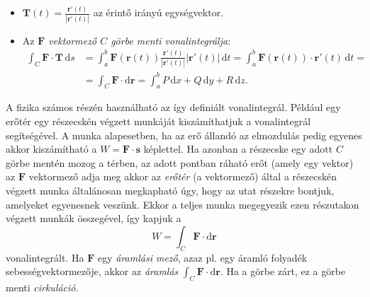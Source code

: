\documentclass[DIV=15,appendixprefix]{scrreprt}
\theoremstyle{definition}
\theoremstyle{remark}
\begin{document}
\begin{description}
\begin{itemize}
\begin{equation*}
					\mathbf{ x } \right)
					= P \left( x,{} y,{} z \right) \mathbf{ i } + Q \left( x,{} y,{} z \right)
					\mathbf{ j } + R \left( x,{} y,{} z \right) \mathbf{ k }.
				\end{equation*}
			\item $ \mathbf{ T } \left( t \right) = \frac{ \mathbf{ r }' \left( t \right) }{ \left|
				\mathbf{ r }' \left( t \right) \right| }$ az érintő irányú egységvektor.
			\item Az \emph{$ \mathbf{ F } $ vektormező $ C $ görbe menti vonalintegrálja}:
				\begin{align*}
					\int_{ C } \mathbf{ F } \cdot \mathbf{ T } \, \mathrm{ d } s &= \int_{ a }^{ b }
					\mathbf{ F } \left(
					\mathbf{ r } \left( t \right) \right) \frac{ \mathbf{ r }' \left( t
					\right) }{ \left| \mathbf{ r }' \left( t \right) \right| } \left| \mathbf{ r }'
					\left( t \right) \right| \, \mathrm{ d } t = \int_{ a }^{ b } \mathbf{ F }
					\left(
					\mathbf{ r } \left( t \right) \right) \cdot  \mathbf{ r }' \left( t \right) \,
					\mathrm{ d } t =\\
					&=\int_{ C } \mathbf{ F } \cdot \mathrm{ d } \mathbf{ r } = \int_{ a }^{ b } P
					\, \mathrm{ d } x + Q \, \mathrm{ d } y + R \, \mathrm{ d } z.
				\end{align*}
		\end{itemize}
\end{description}
A fizika számos részén használható az így definiált vonalintegrál. Például egy erőtér egy részecskén
végzett munkáját kiszámíthatjuk a vonalintegrál segítségével. A munka alapesetben, ha az erő állandó
az elmozdulás pedig egyenes akkor kiszámítható a $ W = \mathbf{ F } \cdot \mathbf{ s } $ képlettel.
Ha azonban a részecske egy adott $ C $ görbe mentén mozog a térben, az adott pontban ráható erőt
(amely egy vektor) az $ \mathbf{ F } $ vektormező adja meg akkor az \emph{erőtér} (a vektormező)
által a részecskén
végzett munka általánosan megkapható úgy, hogy az utat  részekre bontjuk,
amelyeket egyenesnek veszünk. Ekkor a teljes munka megegyezik ezen részutakon végzett munkák
összegével, így kapjuk a
\begin{equation*}
	W = \int_{ C } \mathbf{ F } \cdot \mathrm{ d } \mathbf{ r }
\end{equation*}
vonalintegrált. Ha $ \mathbf{ F } $ egy \emph{áramlási mező}, azaz pl. egy áramló folyadék
sebességvektormezője, akkor az \emph{áramlás} $ \int_{ C } \mathbf{ F } \cdot \mathrm{ d }
\mathbf{ r } $. Ha a görbe zárt, ez a görbe menti \emph{cirkuláció}.
\end{document}
